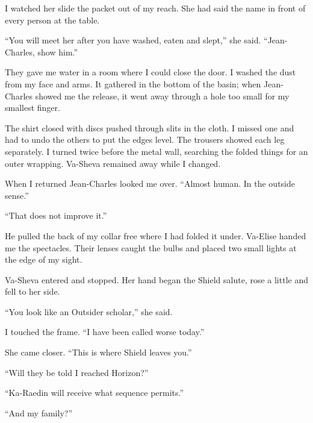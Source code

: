 I watched her slide the packet out of my reach. She had said the name in front of every person at the table.\par

``You will meet her after you have washed, eaten and slept,'' she said. ``Jean-Charles, show him.''\par

\ornament

They gave me water in a room where I could close the door. I washed the dust from my face and arms. It gathered in the bottom of the basin; when Jean-Charles showed me the release, it went away through a hole too small for my smallest finger.\par

The shirt closed with discs pushed through slits in the cloth. I missed one and had to undo the others to put the edges level. The trousers showed each leg separately. I turned twice before the metal wall, searching the folded things for an outer wrapping. Va-Sheva remained away while I changed.\par

When I returned Jean-Charles looked me over. ``Almost human. In the outside sense.''\par

``That does not improve it.''\par

He pulled the back of my collar free where I had folded it under. Va-Elise handed me the spectacles. Their lenses caught the bulbs and placed two small lights at the edge of my sight.\par

Va-Sheva entered and stopped. Her hand began the Shield salute, rose a little and fell to her side.\par

``You look like an Outsider scholar,'' she said.\par

I touched the frame. ``I have been called worse today.''\par

She came closer. ``This is where Shield leaves you.''\par

``Will they be told I reached Horizon?''\par

``Ka-Raedin will receive what sequence permits.''\par

``And my family?''\par

